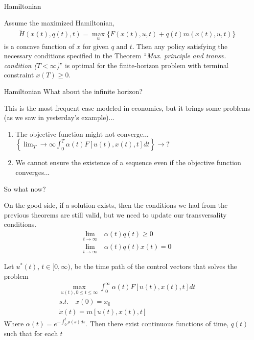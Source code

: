 \documentclass[aspectratio=169]{beamer}
\begin{document}
\begin{frame}{Hamiltonian}
    \begin{theorem}
        Assume the maximized Hamiltonian,
        \begin{align*}
            \tilde{H}(x(t),q(t),t)=\max_{u}\{F(x(t),u,t)+q(t)m(x(t),u,t)\}
        \end{align*}
        is a concave function of $x$ for given $q$ and $t$. Then any policy satisfying the necessary conditions specified in the Theorem ``\emph{Max. principle and transv. condition ($T<\infty$)}'' is optimal for the finite-horizon problem with terminal constraint $x(T)\geq 0$.
    \end{theorem}
    
\end{frame}

\begin{frame}{Hamiltonian}
    What about the infinite horizon?\pause
    
    This is the most frequent case modeled in economics, but it brings some problems (as we saw in yesterday's example)... \pause
    \begin{enumerate}
        \item The objective function might not converge... $\left\{\lim_T\rightarrow\infty \int_0^T\alpha(t)F[u(t),x(t),t]dt\right\}\rightarrow ?$
        \item We cannot ensure the existence of a sequence even if the objective function converges...\pause
    \end{enumerate}
    
    So what now?
\end{frame}

\begin{frame}
    On the good side, if a solution exists, then the conditions we had from the previous theorems are still valid, but we need to update our transversality conditions.
    \begin{align*}
        \lim_{t\rightarrow\infty}&\ \alpha(t)q(t)\geq 0\\
        \lim_{t\rightarrow\infty}&\ \alpha(t)q(t)x(t)=0
    \end{align*}
\end{frame}

\begin{frame}
    \begin{theorem}
        Let $u^*(t)$, $t\in[0,\infty)$, be the time path of the control vectors that solves the problem
        \begin{align*}
            \max_{u(t),0\leq t\leq \infty} \int_0^\infty \alpha(t)F[u(t),x(t),t]dt\\
            s.t.\quad x(0)=x_0\\
            \dot{x}(t)=m[u(t),x(t),t]
        \end{align*}
        Where $\alpha(t)=e^{-\int_0^t\rho(s)ds}$. Then there exist continuous functions of time, $q(t)$ such that for each $t$
    \end{theorem}
    
\end{frame}
\end{document}

